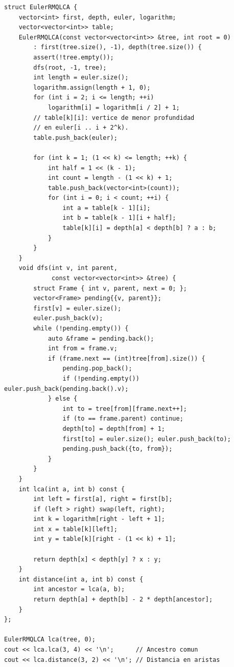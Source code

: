 \begin{lstlisting}[style=cpp]
struct EulerRMQLCA {
    vector<int> first, depth, euler, logarithm;
    vector<vector<int>> table;
    EulerRMQLCA(const vector<vector<int>> &tree, int root = 0)
        : first(tree.size(), -1), depth(tree.size()) {
        assert(!tree.empty());
        dfs(root, -1, tree);
        int length = euler.size();
        logarithm.assign(length + 1, 0);
        for (int i = 2; i <= length; ++i)
            logarithm[i] = logarithm[i / 2] + 1;
        // table[k][i]: vertice de menor profundidad
        // en euler[i .. i + 2^k).
        table.push_back(euler);

        for (int k = 1; (1 << k) <= length; ++k) {
            int half = 1 << (k - 1);
            int count = length - (1 << k) + 1;
            table.push_back(vector<int>(count));
            for (int i = 0; i < count; ++i) {
                int a = table[k - 1][i];
                int b = table[k - 1][i + half];
                table[k][i] = depth[a] < depth[b] ? a : b;
            }
        }
    }
    void dfs(int v, int parent,
             const vector<vector<int>> &tree) {
        struct Frame { int v, parent, next = 0; };
        vector<Frame> pending{{v, parent}};
        first[v] = euler.size();
        euler.push_back(v);
        while (!pending.empty()) {
            auto &frame = pending.back();
            int from = frame.v;
            if (frame.next == (int)tree[from].size()) {
                pending.pop_back();
                if (!pending.empty()) euler.push_back(pending.back().v);
            } else {
                int to = tree[from][frame.next++];
                if (to == frame.parent) continue;
                depth[to] = depth[from] + 1;
                first[to] = euler.size(); euler.push_back(to);
                pending.push_back({to, from});
            }
        }
    }
    int lca(int a, int b) const {
        int left = first[a], right = first[b];
        if (left > right) swap(left, right);
        int k = logarithm[right - left + 1];
        int x = table[k][left];
        int y = table[k][right - (1 << k) + 1];

        return depth[x] < depth[y] ? x : y;
    }
    int distance(int a, int b) const {
        int ancestor = lca(a, b);
        return depth[a] + depth[b] - 2 * depth[ancestor];
    }
};

EulerRMQLCA lca(tree, 0);
cout << lca.lca(3, 4) << '\n';      // Ancestro comun
cout << lca.distance(3, 2) << '\n'; // Distancia en aristas
\end{lstlisting}


